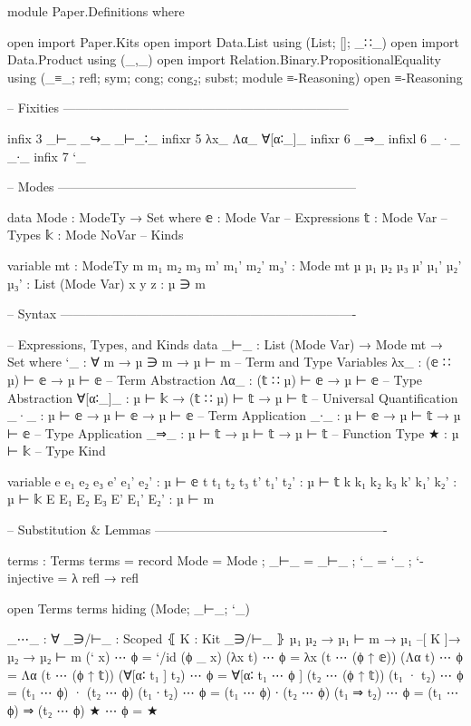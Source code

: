 \begin{code}
module Paper.Definitions where

open import Paper.Kits
open import Data.List using (List; []; _∷_)
open import Data.Product using (_,_)
open import Relation.Binary.PropositionalEquality using (_≡_; refl; sym; cong; cong₂; subst; module ≡-Reasoning)
open ≡-Reasoning

-- Fixities --------------------------------------------------------------------

infix   3  _⊢_  _↪_  _⊢_∶_
infixr  5  λx_  Λα_  ∀[α∶_]_
infixr  6  _⇒_
infixl  6  _·_  _∙_
infix   7  `_

-- Modes -----------------------------------------------------------------------

data Mode : ModeTy → Set where
  𝕖  : Mode Var    -- Expressions
  𝕥  : Mode Var    -- Types
  𝕜  : Mode NoVar  -- Kinds

variable
  mt                         : ModeTy
  m m₁ m₂ m₃ m' m₁' m₂' m₃'  : Mode mt
  µ µ₁ µ₂ µ₃ µ' µ₁' µ₂' µ₃'  : List (Mode Var)
  x y z                      : µ ∋ m

-- Syntax ----------------------------------------------------------------------

-- Expressions, Types, and Kinds
data _⊢_ : List (Mode Var) → Mode mt → Set where
  `_        : ∀ {m} → µ ∋ m → µ ⊢ m        -- Term and Type Variables
  λx_       : (𝕖 ∷ µ) ⊢ 𝕖 → µ ⊢ 𝕖          -- Term Abstraction
  Λα_       : (𝕥 ∷ µ) ⊢ 𝕖 → µ ⊢ 𝕖          -- Type Abstraction
  ∀[α∶_]_   : µ ⊢ 𝕜 → (𝕥 ∷ µ) ⊢ 𝕥 → µ ⊢ 𝕥  -- Universal Quantification
  _·_       : µ ⊢ 𝕖 → µ ⊢ 𝕖 → µ ⊢ 𝕖        -- Term Application
  _∙_       : µ ⊢ 𝕖 → µ ⊢ 𝕥 → µ ⊢ 𝕖        -- Type Application
  _⇒_       : µ ⊢ 𝕥 → µ ⊢ 𝕥 → µ ⊢ 𝕥        -- Function Type
  ★         : µ ⊢ 𝕜                        -- Type Kind

variable
  e e₁ e₂ e₃ e' e₁' e₂'  : µ ⊢ 𝕖
  t t₁ t₂ t₃ t' t₁' t₂'  : µ ⊢ 𝕥
  k k₁ k₂ k₃ k' k₁' k₂'  : µ ⊢ 𝕜
  E E₁ E₂ E₃ E' E₁' E₂'  : µ ⊢ m

-- Substitution & Lemmas -------------------------------------------------------

terms : Terms
terms = record
  { Mode         = Mode
  ; _⊢_          = _⊢_
  ; `_           = `_
  ; `-injective  = λ { refl → refl }
  }

open Terms terms hiding (Mode; _⊢_; `_)

_⋯_ :
  ∀ {_∋/⊢_ : Scoped} ⦃ K : Kit _∋/⊢_ ⦄ {µ₁ µ₂} 
  → µ₁ ⊢ m → µ₁ –[ K ]→ µ₂ → µ₂ ⊢ m
(` x)           ⋯ ϕ = `/id (ϕ _ x)
(λx t)          ⋯ ϕ = λx (t ⋯ (ϕ ↑ 𝕖))
(Λα t)          ⋯ ϕ = Λα (t ⋯ (ϕ ↑ 𝕥))
(∀[α∶ t₁ ] t₂)  ⋯ ϕ = ∀[α∶ t₁ ⋯ ϕ ] (t₂ ⋯ (ϕ ↑ 𝕥))
(t₁ · t₂)       ⋯ ϕ = (t₁ ⋯ ϕ) · (t₂ ⋯ ϕ)
(t₁ ∙ t₂)       ⋯ ϕ = (t₁ ⋯ ϕ) ∙ (t₂ ⋯ ϕ)
(t₁ ⇒ t₂)       ⋯ ϕ = (t₁ ⋯ ϕ) ⇒ (t₂ ⋯ ϕ)
★               ⋯ ϕ = ★


\end{code}

